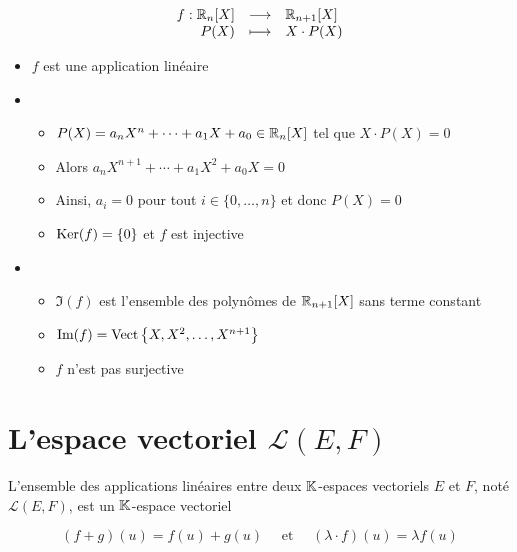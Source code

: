 \begin{frame}
\begin{exemple}
$$\begin{array}{rcl}
f : \mathbb{R}_n[X] & \longrightarrow & \mathbb{R}_{n+1}[X]\\
P(X)  & \longmapsto & X \cdot P(X)
\end{array}$$
\pause
\begin{itemize}\setlength{\itemsep}{6pt}
  \item $f$ est une application linéaire
  \pause
  \item {}
  \pause
  \begin{itemize}
    \item $P(X) = a_n X^n + \cdots +a_1 X + a_0 \in \mathbb{R}_n[X]$ tel que $X \cdot P(X) = 0$
    \pause
    \item Alors $a_n X^{n+1} + \cdots+ a_1 X^2 + a_0 X = 0$
    \pause
    \item Ainsi, $a_i = 0$ pour tout $i \in \{0,\ldots, n\}$ et donc $P(X) = 0$
    \pause
    \item $\mathop{\text{Ker}}\nolimits(f) = \{0\}$ \pause et $f$ est injective
  \end{itemize}
  \pause  
  \item {}
  \pause
  \begin{itemize}
    \item {\footnotesize $\Im(f)$ est l'ensemble des polynômes de $\mathbb{R}_{n+1}[X]$ sans terme constant}
    \pause
    \item $\mathop{\text{Im}}\nolimits(f) = \mathop{\text{Vect}}\nolimits \big\{X, X^2,\dots, X^{n+1}\big\}$
    \pause
    \item $f$ n'est pas surjective
  \end{itemize}
\end{itemize}
\end{exemple}
\end{frame}

\section{L'espace vectoriel $\mathcal{L}(E,F)$}

\begin{frame}

\begin{proposition}
L'ensemble des applications linéaires entre deux $\mathbb{K}$-espaces vectoriels $E$ et $F$, 
noté $\mathcal{L}(E,F)$, est un $\mathbb{K}$-espace vectoriel
\end{proposition}

\pause

   $$(f+g)(u)=f(u)+g(u)\quad \text{ et } \quad (\lambda \cdot f)(u)=\lambda f(u)$$

\end{frame}



